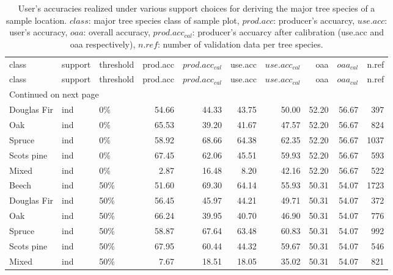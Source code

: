 \begingroup\fontsize{9pt}{10pt}\selectfont
\begin{longtable}{lllrrrrrrr}
	\caption{User's accuracies realized under various support choices for deriving 
		the major tree species of a sample location. $class$: major tree species class of 
		sample plot,
		$prod.acc$: producer's accuarcy, $use.acc$: user's accuracy, $oaa$: overall accuracy,
		$prod.acc_{cal}$: producer's accuarcy after calibration (use.acc and oaa respectively),
		$n.ref$: number of validation data per tree species.}\\ \\
	\hline
	class & support & threshold & prod.acc & $prod.acc_{cal}$ & use.acc & $use.acc_{cal}$ & oaa & $oaa_{cal}$ & n.ref \\ 
	\hline
	\endfirsthead
	\hline
	class & support & threshold & prod.acc & $prod.acc_{cal}$ & use.acc & $use.acc_{cal}$ & oaa & $oaa_{cal}$ & n.ref \\ 
	\hline
	\endhead
	\hline
	\multicolumn{10}{l}{\footnotesize Continued on next page}
	\endfoot
	\endlastfoot
Beech & ind & 0\% & 51.00 & 69.95 & 66.36 & 58.02 & 52.20 & 56.67 & 1857 \\ 
  Douglas Fir & ind & 0\% & 54.66 & 44.33 & 43.75 & 50.00 & 52.20 & 56.67 & 397 \\ 
  Oak & ind & 0\% & 65.53 & 39.20 & 41.67 & 47.57 & 52.20 & 56.67 & 824 \\ 
  Spruce & ind & 0\% & 58.92 & 68.66 & 64.38 & 62.35 & 52.20 & 56.67 & 1037 \\ 
  Scots pine & ind & 0\% & 67.45 & 62.06 & 45.51 & 59.93 & 52.20 & 56.67 & 593 \\ 
  Mixed & ind & 0\% & 2.87 & 16.48 & 8.20 & 42.16 & 52.20 & 56.67 & 522 \\ 
  Beech & ind & 50\% & 51.60 & 69.30 & 64.14 & 55.93 & 50.31 & 54.07 & 1723 \\ 
  Douglas Fir & ind & 50\% & 56.45 & 45.97 & 44.21 & 49.71 & 50.31 & 54.07 & 372 \\ 
  Oak & ind & 50\% & 66.24 & 39.95 & 40.70 & 46.90 & 50.31 & 54.07 & 776 \\ 
  Spruce & ind & 50\% & 58.87 & 67.64 & 63.48 & 60.83 & 50.31 & 54.07 & 992 \\ 
  Scots pine & ind & 50\% & 67.95 & 60.44 & 44.32 & 59.67 & 50.31 & 54.07 & 546 \\ 
  Mixed & ind & 50\% & 7.67 & 18.51 & 18.05 & 35.02 & 50.31 & 54.07 & 821 \\ 

\end{longtable}
